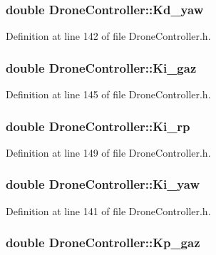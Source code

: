 \subsubsection[{Kd\-\_\-yaw}]{\setlength{\rightskip}{0pt plus 5cm}double Drone\-Controller\-::\-Kd\-\_\-yaw}\label{classDroneController_a3b9e1f76cd122f48bfe332dc37e0ba64}


Definition at line 142 of file Drone\-Controller.\-h.

\subsubsection[{Ki\-\_\-gaz}]{\setlength{\rightskip}{0pt plus 5cm}double Drone\-Controller\-::\-Ki\-\_\-gaz}\label{classDroneController_a19d01dd0da6ab4bf0cce05597184aa29}


Definition at line 145 of file Drone\-Controller.\-h.

\subsubsection[{Ki\-\_\-rp}]{\setlength{\rightskip}{0pt plus 5cm}double Drone\-Controller\-::\-Ki\-\_\-rp}\label{classDroneController_aa3b81417243257765cb81098e714e093}


Definition at line 149 of file Drone\-Controller.\-h.

\subsubsection[{Ki\-\_\-yaw}]{\setlength{\rightskip}{0pt plus 5cm}double Drone\-Controller\-::\-Ki\-\_\-yaw}\label{classDroneController_aa6037bdb5a68f93f91abfae269647714}


Definition at line 141 of file Drone\-Controller.\-h.

\subsubsection[{Kp\-\_\-gaz}]{\setlength{\rightskip}{0pt plus 5cm}double Drone\-Controller\-::\-Kp\-\_\-gaz}\label{classDroneController_ac96837f4eaa12f42baccf933d2a62f5b}


